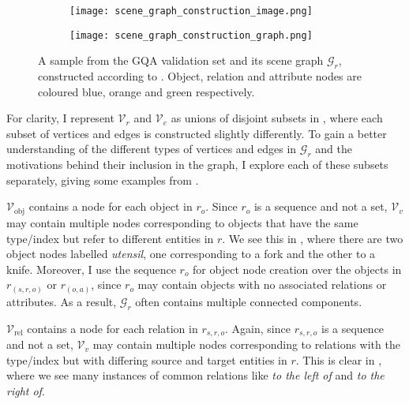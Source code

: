 \begin{figure}[htbp]
    \centering
    \begin{subfigure}[l]{0.49\textwidth}
        \texttt{[image: scene\_graph\_construction\_image.png]}
        \label{fig:scene_graph_construction_image}
    \end{subfigure}
    \begin{subfigure}[r]{0.49\textwidth}
        \texttt{[image: scene\_graph\_construction\_graph.png]}
        \label{fig:scene_graph_construction_graph}
    \end{subfigure}
    \caption{A sample from the GQA validation set and its scene graph \(\mathcal{G}_r\), constructed according to \algorithmcfname{ \ref{algorithm:scene_graph_construction}}. Object, relation and attribute nodes are coloured blue, orange and green respectively.}
    \label{fig:scene_graph_construction}
\end{figure}

For clarity, I represent \(\mathcal{V}_r\) and \(\mathcal{V}_e\) as unions of disjoint subsets in \algorithmcfname{ \ref{algorithm:scene_graph_construction}}, where each subset of vertices and edges is constructed slightly differently. To gain a better understanding of the different types of vertices and edges in \(\mathcal{G}_r\) and the motivations behind their inclusion in the graph, I explore each of these subsets separately, giving some examples from \figureautorefname{ \ref{fig:scene_graph_construction}}.

\(\mathcal{V}_\text{obj}\) contains a node for each object in \(r_o\). Since \(r_o\) is a sequence and not a set, \(\mathcal{V}_v\) may contain multiple nodes corresponding to objects that have the same type/index but refer to different entities in \(r\). We see this in \figureautorefname{ \ref{fig:scene_graph_construction}}, where there are two object nodes labelled \textit{utensil}, one corresponding to a fork and the other to a knife. Moreover, I use the sequence \(r_o\) for object node creation over the objects in \(r_{(s, r, o)}\) or \(r_{(o, a)}\), since \(r_o\) may contain objects with no associated relations or attributes. As a result, \(\mathcal{G}_r\) often contains multiple connected components.

\(\mathcal{V}_\text{rel}\) contains a node for each relation in \(r_{s, r, o}\). Again, since \(r_{s, r, o}\) is a sequence and not a set, \(\mathcal{V}_v\) may contain multiple nodes corresponding to relations with the type/index but with differing source and target entities in \(r\). This is clear in \figureautorefname{ \ref{fig:scene_graph_construction}}, where we see many instances of common relations like \textit{to the left of} and \textit{to the right of}.

